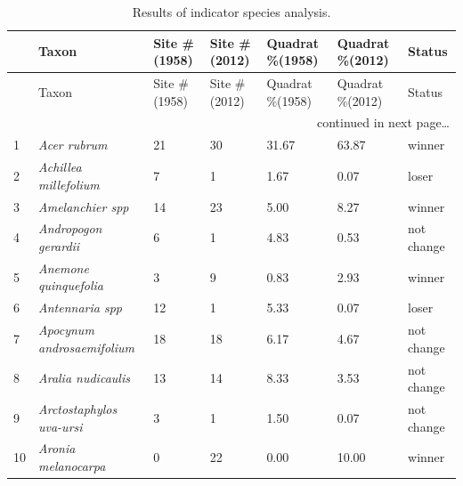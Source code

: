 \begin{onehalfspace}
\begin{longtable}[h]{p{}p{}p{}p{}p{}p{}p{}}
\caption{Results of indicator species analysis.}\\

\toprule

 & Taxon & Site \#(1958) & Site \#(2012) & Quadrat \%(1958) & Quadrat \%(2012) & Status\\
 \hline
\endfirsthead
\hline
& Taxon & Site \#(1958) & Site \#(2012) & Quadrat \%(1958) & Quadrat \%(2012) & Status\\
\hline
 \endhead
 \hline
\multicolumn{7}{r}{continued in next page\dots} \\
\endfoot
\bottomrule
\endlastfoot

1 & \emph{Acer rubrum } &  21 &  30 & 31.67 & 63.87 & winner \\
  2 & \emph{Achillea millefolium } &   7 &   1 & 1.67 & 0.07 & loser \\
  3 & \emph{Amelanchier spp } &  14 &  23 & 5.00 & 8.27 & winner \\
  4 & \emph{Andropogon gerardii } &   6 &   1 & 4.83 & 0.53 & not change \\
  5 & \emph{Anemone quinquefolia}  &   3 &   9 & 0.83 & 2.93 & winner \\
  6 & \emph{Antennaria spp } &  12 &   1 & 5.33 & 0.07 & loser \\
  7 & \emph{Apocynum androsaemifolium } &  18 &  18 & 6.17 & 4.67 & not change \\
  8 & \emph{Aralia nudicaulis } &  13 &  14 & 8.33 & 3.53 & not change \\
  9 & \emph{Arctostaphylos uva-ursi}  &   3 &   1 & 1.50 & 0.07 & not change \\
  10 & \emph{Aronia melanocarpa}  &   0 &  22 & 0.00 & 10.00 & winner \\
  \end{longtable}
\end{onehalfspace}

